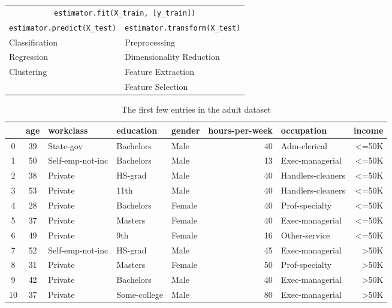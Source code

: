 \begin{table}[H]
    \begin{tabular}{ll}
        \hline
        \multicolumn{2}{c}{\verb|estimator.fit(X_train, [y_train])|}          \\
        \verb|estimator.predict(X_test)| & \verb|estimator.transform(X_test)| \\
        \hline
        Classification                   & Preprocessing                      \\
        Regression                       & Dimensionality Reduction           \\
        Clustering                       & Feature Extraction                 \\
                                         & Feature Selection                  \\
        \hline
    \end{tabular}
\end{table}

\begin{table}
    \centering
    \caption{The first few entries in the adult dataset}
    \label{The first few entries in the adult dataset}
    \begin{tabular}{cclllrlr}
        \hline
           & age & workclass        & education    & gender & hours-per-week & occupation        & income \\
        \hline
        0  & 39  & State-gov        & Bachelors    & Male   & 40             & Adm-clerical      & <=50K  \\
        1  & 50  & Self-emp-not-inc & Bachelors    & Male   & 13             & Exec-managerial   & <=50K  \\
        2  & 38  & Private          & HS-grad      & Male   & 40             & Handlers-cleaners & <=50K  \\
        3  & 53  & Private          & 11th         & Male   & 40             & Handlers-cleaners & <=50K  \\
        4  & 28  & Private          & Bachelors    & Female & 40             & Prof-specialty    & <=50K  \\
        5  & 37  & Private          & Masters      & Female & 40             & Exec-managerial   & <=50K  \\
        6  & 49  & Private          & 9th          & Female & 16             & Other-service     & <=50K  \\
        7  & 52  & Self-emp-not-inc & HS-grad      & Male   & 45             & Exec-managerial   & >50K   \\
        8  & 31  & Private          & Masters      & Female & 50             & Prof-specialty    & >50K   \\
        9  & 42  & Private          & Bachelors    & Male   & 40             & Exec-managerial   & >50K   \\
        10 & 37  & Private          & Some-college & Male   & 80             & Exec-managerial   & >50K   \\
        \hline
    \end{tabular}
\end{table}
